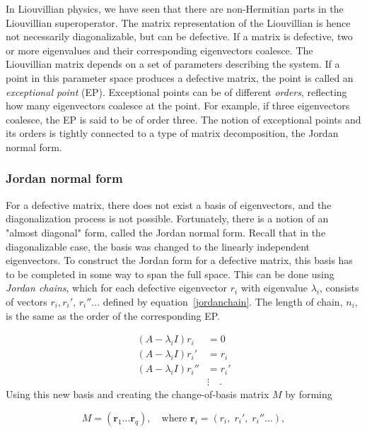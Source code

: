 \documentclass[../main.tex]{subfiles}
\begin{document}
In Liouvillian physics, we have seen that there are non-Hermitian parts in the Liouvillian superoperator. The matrix representation of the Liouvillian is hence not necessarily diagonalizable, but can be defective. If a matrix is defective, two or more eigenvalues and their corresponding eigenvectors coalesce. The Liouvillian matrix depends on a set of parameters describing the system. If a point in this parameter space produces a defective matrix, the point is called an \textit{exceptional point} (EP). Exceptional points can be of different \textit{orders}, reflecting how many eigenvectors coalesce at the point. For example, if three eigenvectors coalesce, the EP is said to be of order three. The notion of exceptional points and its orders is tightly connected to a type of matrix decomposition, the Jordan normal form.

\subsubsection{Jordan normal form}

For a defective matrix, there does not exist a basis of eigenvectors, and the diagonalization process is not possible. Fortunately, there is a notion of an "almost diagonal" form, called the Jordan normal form. Recall that in the diagonalizable case, the basis was changed to the linearly independent eigenvectors. To construct the Jordan form for a defective matrix, this basis has to be completed in some way to span the full space. This can be done using \textit{Jordan chains}, which for each defective eigenvector $r_i$ with eigenvalue $\lambda_i$, consists of vectors $r_i, r_i'$, $r_i'' \dots$ defined by equation~\ref{jordanchain}. The length of chain, $n_i$, is the same as the order of the corresponding EP.

\begin{equation}\label{jordanchain}
\begin{aligned}
    (A-\lambda_iI)r_i &= 0 \\
    (A-\lambda_iI)r_i' &= r_i \\
    (A-\lambda_iI)r_i'' &= r_i' \\
    &\vdots \quad.
\end{aligned}
\end{equation}
Using this new basis and creating the change-of-basis matrix $M$ by forming

\begin{equation}\label{chofba}
    M = (\boldsymbol{r}_1 \dots \boldsymbol{r}_q), \quad \text{where } \boldsymbol{r}_i = (r_i,\; r_i',\; r_i'' \dots), 
\end{equation}
\end{document}
